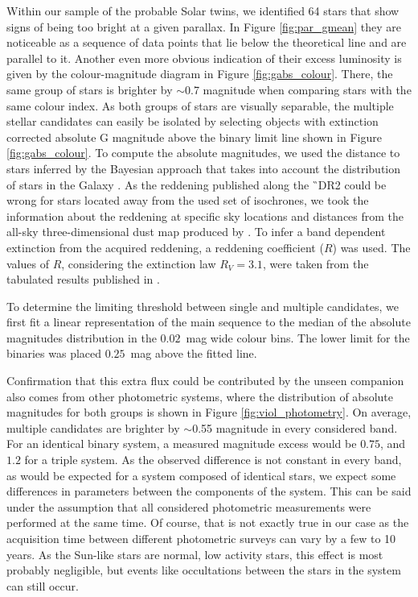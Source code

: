 Within our sample of the probable Solar twins, we identified 64 stars that show signs of being too bright at a given parallax. In Figure \ref{fig:par_gmean} they are noticeable as a sequence of data points that lie below the theoretical line and are parallel to it. Another even more obvious indication of their excess luminosity is given by the colour-magnitude diagram in Figure \ref{fig:gabs_colour}. There, the same group of stars is brighter by $\sim$0.7 magnitude when comparing stars with the same colour index. As both groups of stars are visually separable, the multiple stellar candidates can easily be isolated by selecting objects with extinction corrected absolute G magnitude above the binary limit line shown in Figure \ref{fig:gabs_colour}. To compute the absolute magnitudes, we used the distance to stars inferred by the Bayesian approach that takes into account the distribution of stars in the Galaxy \citep{2018AJ....156...58B}. As the reddening published along the \G\ DR2 \citep{2018A&A...616A...8A} could be wrong for stars located away from the used set of isochrones, we took the information about the reddening at specific sky locations and distances from the all-sky three-dimensional dust map produced by \citet{2017A&A...606A..65C}. To infer a band dependent extinction from the acquired reddening, a reddening coefficient ($R$) was used. The values of $R$, considering the extinction law $R_V = 3.1$, were taken from the tabulated results published in \citet{2011ApJ...737..103S}. 

To determine the limiting threshold between single and multiple candidates, we first fit a linear representation of the main sequence to the median of the absolute magnitudes distribution in the $0.02$~mag wide colour bins. The lower limit for the binaries was placed $0.25$~mag above the fitted line.

Confirmation that this extra flux could be contributed by the unseen companion also comes from other photometric systems, where the distribution of absolute magnitudes for both groups is shown in Figure \ref{fig:viol_photometry}. On average, multiple candidates are brighter by $\sim$0.55 magnitude in every considered band. For an identical binary system, a measured magnitude excess would be $0.75$, and $1.2$ for a triple system. As the observed difference is not constant in every band, as would be expected for a system composed of identical stars, we expect some differences in parameters between the components of the system. This can be said under the assumption that all considered photometric measurements were performed at the same time. Of course, that is not exactly true in our case as the acquisition time between different photometric surveys can vary by a few to 10 years. As the Sun-like stars are normal, low activity stars, this effect is most probably negligible, but events like occultations between the stars in the system can still occur. 

